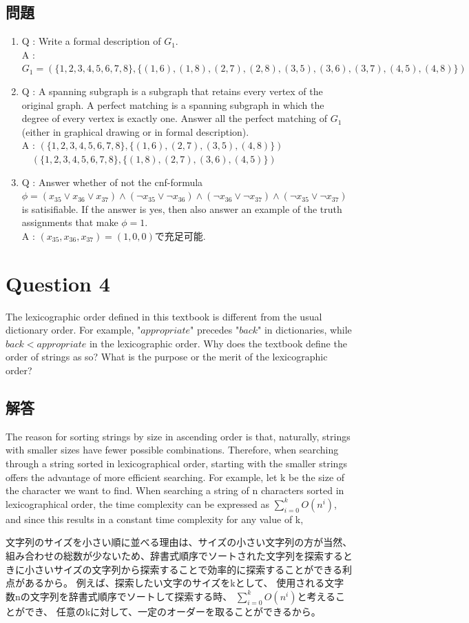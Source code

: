 \documentclass[uplatex,a4paper,11pt]{jsarticle}
\begin{document}
\subsection*{問題}
\begin{enumerate}
      \item Q : Write a formal description of $G_1$. \\
            A : $G_1 = (\{1,2,3,4,5,6,7,8\}, \{(1,6),(1,8),(2,7),(2,8),(3,5),(3,6),(3,7),(4,5),(4,8)\})$
      \item Q : A spanning subgraph is a subgraph that retains every vertex of the original graph. A perfect matching is a spanning subgraph in which the degree of every vertex is exactly one. Answer all the perfect matching of $G_1$
                  (either in graphical drawing or in formal description).  \\
            A : $(\{1,2,3,4,5,6,7,8\}, \{(1,6),(2,7),(3,5),(4,8)\})$ \\
                  \quad \ \ $(\{1,2,3,4,5,6,7,8\},\{(1,8),(2,7),(3,6),(4,5)\})$
      \item Q : Answer whether of not the cnf-formula \\
                  $\phi = (x_{35} \lor x_{36} \lor x_{37}) \land (\neg x_{35} \lor \neg x_{36}) \land (\neg x_{36} \lor \neg x_{37}) \land (\neg x_{35} \lor \neg x_{37})$ \\
                  is satisifiable. If the answer is yes, then also answer an example of the truth assignments that make $\phi = 1$. \\
            A : $(x_{35}, x_{36}, x_{37}) = (1,0,0)$で充足可能.
\end{enumerate}

\section*{Question 4}
The lexicographic order defined in this textbook is different from the usual dictionary order. For example, "$appropriate$"
precedes "$back$" 
in dictionaries, while $back < appropriate$
in the lexicographic order. Why does the textbook define the order of strings as so? What is the purpose or the merit of the lexicographic order?

\subsection*{解答}
The reason for sorting strings by size in ascending order is that, naturally, strings with smaller sizes have fewer possible combinations. Therefore, when searching through a string sorted in lexicographical order, starting with the smaller strings offers the advantage of more efficient searching.
For example, let k be the size of the character we want to find.
When searching a string of n characters sorted in lexicographical order,
the time complexity can be expressed as $\sum_{i=0}^{k}{O(n^i)}$,
and since this results in a constant time complexity for any value of k,

文字列のサイズを小さい順に並べる理由は、サイズの小さい文字列の方が当然、組み合わせの総数が少ないため、辞書式順序でソートされた文字列を探索するときに小さいサイズの文字列から探索することで効率的に探索することができる利点があるから。
例えば、探索したい文字のサイズをkとして、
使用される文字数nの文字列を辞書式順序でソートして探索する時、
$\sum_{i=0}^{k}{O(n^i)}$と考えることができ、
任意のkに対して、一定のオーダーを取ることができるから。
\end{document}
